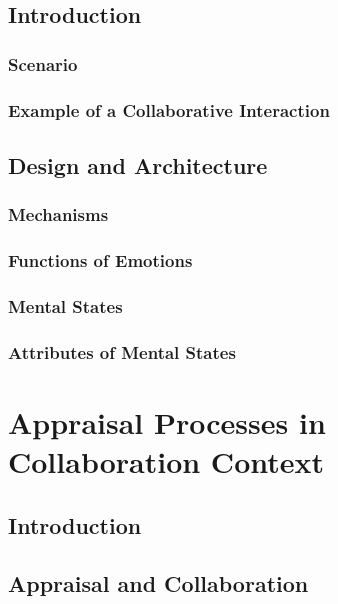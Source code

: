 \documentclass[12pt]{report}
\begin{document}
\section{Introduction}

\subsection{Scenario}

\subsection{Example of a Collaborative Interaction}

\section{Design and Architecture}

\subsection{Mechanisms}

\subsection{Functions of Emotions}

\subsection{Mental States}

\subsection{Attributes of Mental States}

\chapter{Appraisal Processes in Collaboration Context}
\label{ch:appraisals}

\section{Introduction}

\section{Appraisal and Collaboration}
\end{document}
